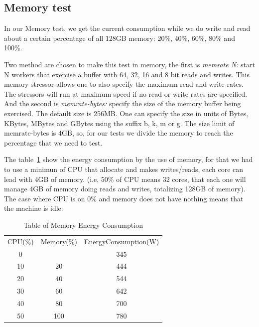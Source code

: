 \documentclass[runningheads,a4paper]{llncs}
\begin{document}
\subsection{Memory test}
In our Memory test, we get the current consumption while we do write and read about a certain percentage of all 128GB memory: 20\%, 40\%, 60\%, 80\% and 100\%.


Two method are chosen to make this test in memory, the first is \textit{memrate N:}
start  N  workers  that  exercise  a  buffer  with  64,  32,  16  and  8 bit  reads  and  writes.  This  memory stressor  allows  one  to  also  specify  the  maximum  read  and  write  rates.  The  stressors  will  run  at maximum speed if no read or write rates are specified.
And the second is \textit{memrate-bytes:} specify the size of the memory buffer being exercised. The default size is 256MB. One can specify
the size in units of Bytes, KBytes, MBytes and GBytes using the suffix b, k, m or g.
The size limit of memrate-bytes is 4GB, so, for our tests we divide the memory to reach the percentage that we need to test.

The table~\ref{tab:table} show the energy consumption by the use of memory, for that we had to use a minimun of CPU that allocate and makes writes/reads, each core can lead with 4GB of memory. (i.e, 50\% of CPU means 32 cores, that each one will manage 4GB of memory doing reads and writes, totalizing 128GB of memory). The case where CPU is on 0\% and memory does not have nothing means that the machine is idle.

\begin{table}[]
\centering
\caption{Table of Memory Energy Consumption}
\label{tab:table}
\begin{tabular}{|c | c | c |}
CPU(\%) & Memory(\%) & EnergyConsumption(W) \\
0       &            & 345                  \\
10      & 20         & 444                  \\
20      & 40         & 544                  \\
30      & 60         & 642                  \\
40      & 80         & 700                  \\
50      & 100        & 780                 
\end{tabular}
\end{table}
\end{document}
